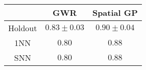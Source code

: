 
\begin{tabular}{c|cc}
 & GWR & Spatial GP \\ \hline
Holdout & $\mathbf{0.83 \pm 0.03}$ & $0.90 \pm 0.04$ \\ 
1NN & $\mathbf{0.80}$ & $0.88$ \\ 
SNN & $\mathbf{0.80}$ & $0.88$ 
\end{tabular}